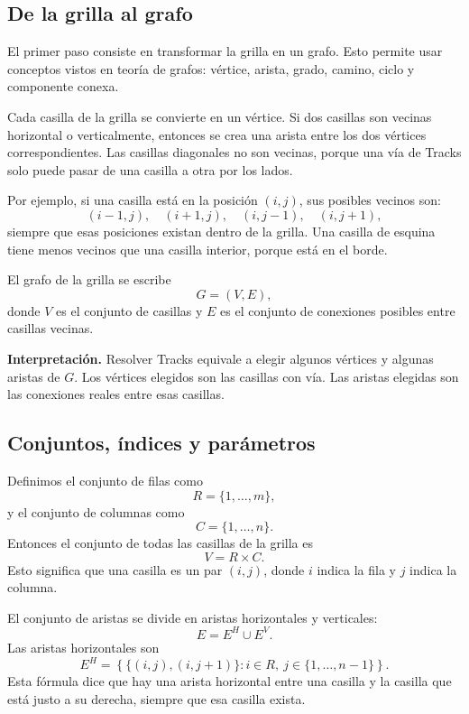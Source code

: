 \subsection{De la grilla al grafo}

El primer paso consiste en transformar la grilla en un grafo. Esto permite usar conceptos vistos en teoría de grafos: vértice, arista, grado, camino, ciclo y componente conexa.

Cada casilla de la grilla se convierte en un vértice. Si dos casillas son vecinas horizontal o verticalmente, entonces se crea una arista entre los dos vértices correspondientes. Las casillas diagonales no son vecinas, porque una vía de Tracks solo puede pasar de una casilla a otra por los lados.

Por ejemplo, si una casilla está en la posición \((i,j)\), sus posibles vecinos son:
\[
    (i-1,j), \quad (i+1,j), \quad (i,j-1), \quad (i,j+1),
\]
siempre que esas posiciones existan dentro de la grilla. Una casilla de esquina tiene menos vecinos que una casilla interior, porque está en el borde.

El grafo de la grilla se escribe
\[
    G = (V,E),
\]
donde \(V\) es el conjunto de casillas y \(E\) es el conjunto de conexiones posibles entre casillas vecinas.

\begin{formal}
    \textbf{Interpretación.}
    Resolver Tracks equivale a elegir algunos vértices y algunas aristas de \(G\). Los vértices elegidos son las casillas con vía. Las aristas elegidas son las conexiones reales entre esas casillas.
\end{formal}

\subsection{Conjuntos, índices y parámetros}

Definimos el conjunto de filas como
\[
    R = \{1,\dots,m\},
\]
y el conjunto de columnas como
\[
    C = \{1,\dots,n\}.
\]
Entonces el conjunto de todas las casillas de la grilla es
\[
    V = R \times C.
\]
Esto significa que una casilla es un par \((i,j)\), donde \(i\) indica la fila y \(j\) indica la columna.

El conjunto de aristas se divide en aristas horizontales y verticales:
\[
    E = E^H \cup E^V.
\]
Las aristas horizontales son
\[
    E^H =
    \left\{
        \{(i,j),(i,j+1)\} :
        i \in R,\ j \in \{1,\dots,n-1\}
    \right\}.
\]
Esta fórmula dice que hay una arista horizontal entre una casilla y la casilla que está justo a su derecha, siempre que esa casilla exista.

